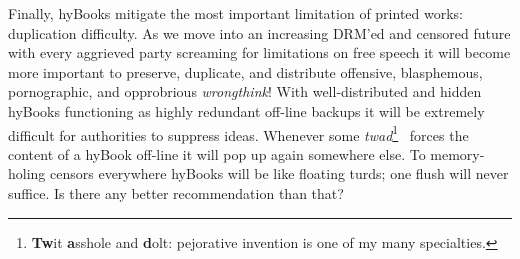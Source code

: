 Finally, hyBooks mitigate the most important limitation of printed
works: duplication difficulty. As we move into an increasing DRM'ed and
censored future with every aggrieved party screaming for limitations on
free speech it will become more important to preserve,
duplicate, and distribute offensive, blasphemous, pornographic, and
opprobrious \emph{wrongthink}! With well-distributed and hidden hyBooks
functioning as highly redundant off-line backups it will be extremely
difficult for authorities to suppress ideas. Whenever some
\emph{twad}\footnote{\textbf{Tw}it \textbf{a}sshole and \textbf{d}olt: pejorative invention
 is one of my many specialties.}\ %
  forces the content of a
hyBook off-line it will pop up again somewhere else. To memory-holing
censors everywhere hyBooks will be like floating turds; one flush will
never suffice. Is there any better recommendation than that?

%
%
%
%
%



%